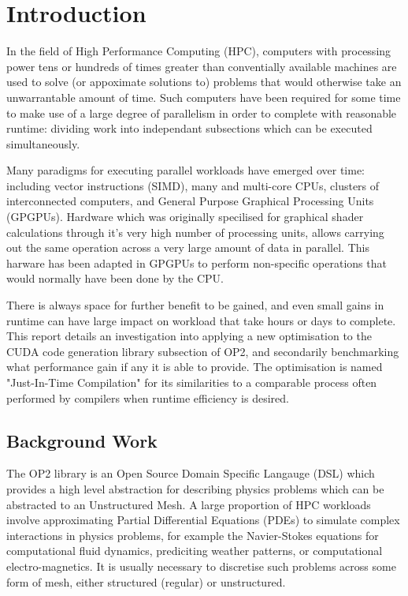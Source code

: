 
\section{Introduction}

In the field of High Performance Computing (HPC), computers with processing power tens or hundreds of times greater than conventially available machines are used to solve (or appoximate solutions to) problems that would otherwise take an unwarrantable amount of time. Such computers have been required for some time to make use of a large degree of parallelism in order to complete with reasonable runtime: dividing work into independant subsections which can be executed simultaneously.
\par Many paradigms for executing parallel workloads have emerged over time: including vector instructions (SIMD), many and multi-core CPUs, clusters of interconnected computers, and General Purpose Graphical Processing Units (GPGPUs). Hardware which was originally specilised for graphical shader calculations through it's very high number of processing units, allows carrying out the same operation across a very large amount of data in parallel. This harware has been adapted in GPGPUs to perform non-specific operations that would normally have been done by the CPU.
\par
There is always space for further benefit to be gained, and even small gains in runtime can have large impact on workload that take hours or days to complete. This report details an investigation into applying a new optimisation to the CUDA code generation library subsection of OP2, and secondarily benchmarking what performance gain if any it is able to provide. The optimisation is named "Just-In-Time Compilation" for its similarities to a comparable process often performed by compilers when runtime efficiency is desired.

\subsection{Background Work}
\label{sec:bgwork}
The OP2 library is an Open Source Domain Specific Langauge (DSL) which provides a high level abstraction for describing physics problems which can be abstracted to an Unstructured Mesh.
A large proportion of HPC workloads involve approximating Partial Differential Equations (PDEs) to simulate complex interactions in physics problems, for example the Navier-Stokes equations for computational fluid dynamics, prediciting weather patterns, or computational electro-magnetics. It is usually necessary to discretise such problems across some form of mesh, either structured (regular) or unstructured.

